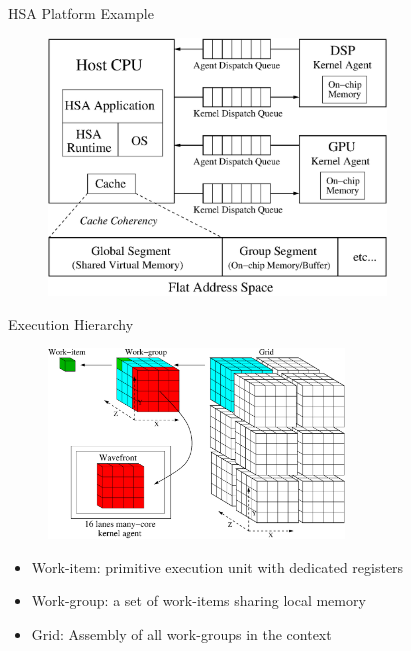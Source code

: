 \documentclass{beamer}
\begin{document}
\begin{CJK}{UTF8}{bkai}
            \begin{frame}{HSA Platform Example}
                \begin{figure}[!ht]
                    \centering
                    \includegraphics[width=0.8\textwidth]{./figs/systemspec.eps}
                    \label{fig:systemspec}
                \end{figure}
            \end{frame}

            \begin{frame}{Execution Hierarchy}
                \begin{figure}[t] 
                    \centering
                    \includegraphics[width=0.7\textwidth]{./figs/grid.eps}
                    \label{fig:grid}
                \end{figure}%
                \begin{itemize}
                    \item <2-> {Work-item: primitive execution unit with dedicated registers}
                    \item <3-> {Work-group: a set of work-items sharing local memory}
                    \item <4-> {Grid: Assembly of all work-groups in the context}
                \end{itemize}
            \end{frame}


\end{CJK}
\end{document}
